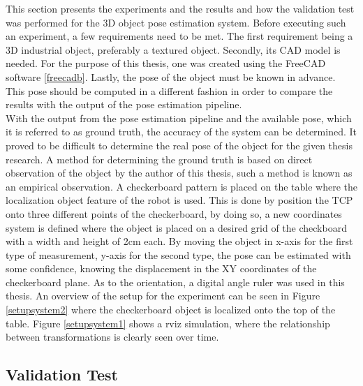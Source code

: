 This section presents the experiments and the results and how the validation test was performed for the 3D object pose estimation system. Before executing such an experiment, a few requirements need to be met. The first requirement being a 3D industrial object, preferably a textured object. Secondly, its CAD model is needed. For the purpose of this thesis, one was created using the FreeCAD software \ref{freecadb}. Lastly, the pose of the object must be known in advance. This pose should be computed in a different fashion in order to compare the results with the output of the pose estimation pipeline.\\
With the output from the pose estimation pipeline and the available pose, which it is referred to as ground truth, the accuracy of the system can be determined. It proved to be difficult to determine the real pose of the object for the given thesis research. A method for determining the ground truth is based on direct observation of the object by the author of this thesis, such a method is known as an empirical observation. A checkerboard pattern is placed on the table where the localization object feature of the robot is used. This is done by position the TCP onto three different points of the checkerboard, by doing so, a new coordinates system is defined where the object is placed on a desired grid of the checkboard with a width and height of 2cm each. By moving the object in x-axis for the first type of measurement, y-axis for the second type, the pose can be estimated with some confidence, knowing the displacement in the XY coordinates of  the checkerboard plane. As to the orientation, a digital angle ruler was used in this thesis. An overview of the setup for the experiment can be seen in Figure \ref{setupsystem2} where the checkerboard object is localized onto the top of the table. Figure \ref{setupsystem1} shows a rviz simulation, where the relationship between transformations is clearly seen over time. 

\subsection{Validation Test}\label{valitest}

